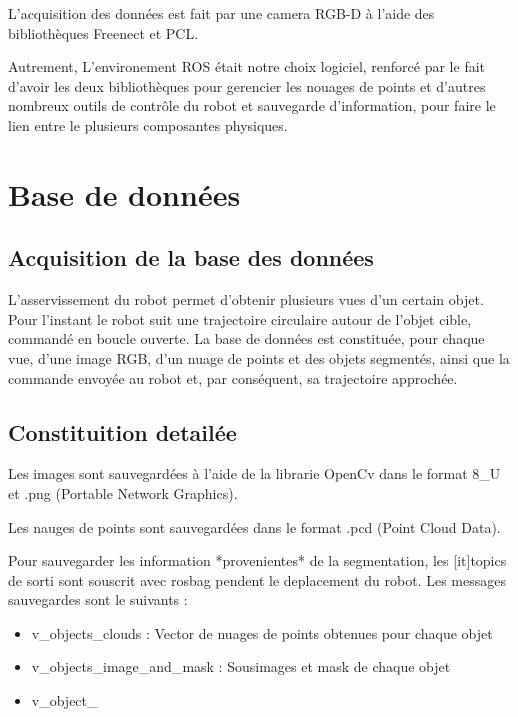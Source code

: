 L'acquisition des données est fait par une camera RGB-D à l'aide des bibliothèques Freenect et PCL.

Autrement, L'environement ROS était notre choix logiciel, renforcé par le fait d'avoir les deux bibliothèques pour gerencier les nouages de points et d'autres nombreux outils de contrôle du robot et sauvegarde d'information, pour faire le lien entre le plusieurs composantes physiques.

\section{ Base de données}

\subsection{Acquisition de la base des données}
L'asservissement du robot permet d'obtenir plusieurs vues d'un certain objet. Pour l'instant le robot suit une trajectoire circulaire autour de l'objet cible, commandé en boucle ouverte. La base de données est constituée, pour chaque vue, d'une image RGB, d'un nuage de points et des objets segmentés, ainsi que la commande envoyée au robot et, par conséquent, sa trajectoire approchée.

\subsection{Constituition detailée}

Les images sont sauvegardées à l'aide de la librarie OpenCv dans le format 8_U et .png (Portable Network Graphics).

Les nauges de points sont sauvegardées dans le format .pcd (Point Cloud Data).

Pour sauvegarder les information *provenientes* de la segmentation, les [it]topics de sorti sont souscrit avec rosbag pendent le deplacement du robot. Les messages sauvegardes sont le suivants :

\begin{itemize}
\item v_objects_clouds : Vector de nuages de points obtenues pour chaque objet 

\item v_objects_image_and_mask : Sousimages et mask de chaque objet

\item v_object_

\end{itemize}


